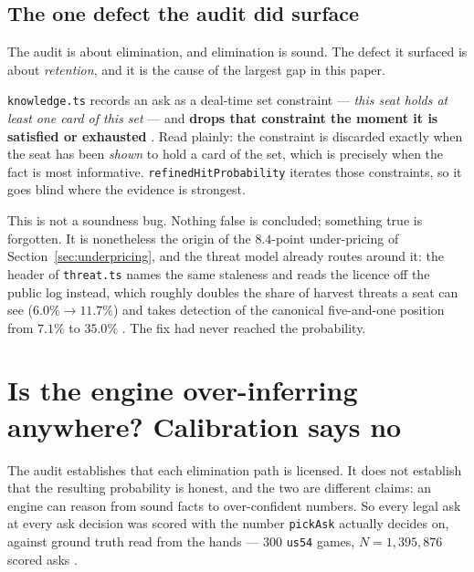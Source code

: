 \documentclass[11pt]{article}
\newcommand{\code}[1]{\texttt{#1}}
\newcommand{\usff}{\code{us54}}
\begin{document}
\subsection{The one defect the audit did surface}
\label{sec:staleness}

The audit is about elimination, and elimination is sound. The defect it surfaced is about
\emph{retention}, and it is the cause of the largest gap in this paper.

\code{knowledge.ts} records an ask as a deal-time set constraint --- \emph{this seat holds
at least one card of this set} --- and \textbf{drops that constraint the moment it is
satisfied or exhausted} \cite{repo,concession}. Read plainly: the constraint is discarded
exactly when the seat has been \emph{shown} to hold a card of the set, which is precisely
when the fact is most informative. \code{refinedHitProbability} iterates those
constraints, so it goes blind where the evidence is strongest.

This is not a soundness bug. Nothing false is concluded; something true is forgotten. It
is nonetheless the origin of the $8.4$-point under-pricing of
Section~\ref{sec:underpricing}, and the threat model already routes around it: the header
of \code{threat.ts} names the same staleness and reads the licence off the public log
instead, which roughly doubles the share of harvest threats a seat can see
($6.0\% \to 11.7\%$) and takes detection of the canonical five-and-one position from
$7.1\%$ to $35.0\%$ \cite{concession,repo}. The fix had never reached the probability.

\section{Is the engine over-inferring anywhere? Calibration says no}
\label{sec:calibration}

The audit establishes that each elimination path is licensed. It does not establish that
the resulting probability is honest, and the two are different claims: an engine can
reason from sound facts to over-confident numbers. So every legal ask at every ask
decision was scored with the number \code{pickAsk} actually decides on, against ground
truth read from the hands --- $300$ \usff{} games, $N = 1{,}395{,}876$ scored asks
\cite{asking}.
\end{document}
